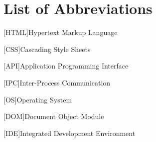 \section{List of Abbreviations}
\label{sec:list-of-abbreviations}

\begin{acronym}
    [HTML]{Hypertext Markup Language}
\end{acronym}

\begin{acronym}
    [CSS]{Cascading Style Sheets}
\end{acronym}

\begin{acronym}
    [API]{Application Programming Interface}
\end{acronym}

\begin{acronym}
    [IPC]{Inter-Process Communication}
\end{acronym}

\begin{acronym}
    [OS]{Operating System}
\end{acronym}


\begin{acronym}
    [DOM]{Document Object Module}
\end{acronym}

\begin{acronym}
    [IDE]{Integrated Development Environment}
\end{acronym}

